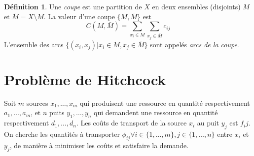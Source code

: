 \documentclass[a4paper]{report}
\theoremstyle{definition}
\newtheorem*{definition}{Définition}
\theoremstyle{remark}
\theoremstyle{plain}
\begin{document}
\begin{definition}
Une \emph{coupe} est une partition de \(X\) en deux ensembles (disjoints) \(M\)
et \(\bar M=X\setminus M\). La valeur d'une coupe \(\{M,\bar M\}\) est
\[C(M,\bar M)=\sum_{x_i\in M}\sum_{x_j\in\bar M}c_{ij}\] L'ensemble des arcs
\(\{(x_i,x_j)|x_i\in M,x_j\in\bar M\}\) sont appelés \emph{arcs de la coupe}.
\end{definition}

\section{Problème de Hitchcock}
Soit \(m\) sources \(x_1,\dots,x_m\) qui produisent une ressource en quantité
respectivement \(a_1,\dots,a_m\), et \(n\) puits \(y_1,\dots,y_n\) qui demandent
une ressource en quantité respectivement \(d_1,\dots,d_n\). Les coûts de
transport de la source \(x_i\) au puit \(y_j\) est \(f_ij\). On cherche les
quantités à transporter \(\phi_{ij}\forall i\in\{1,\dots,m\},j\in\{1,\dots,n\}\)
entre \(x_i\) et \(y_j\), de manière à minimiser les coûts et satisfaire la
demande.
\end{document}
